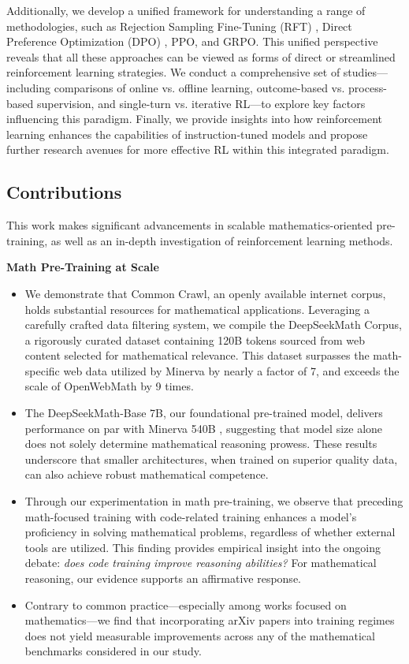 Additionally, we develop a unified framework for understanding a range of methodologies, such as Rejection Sampling Fine-Tuning (RFT) \citep{yuan2023scaling}, Direct Preference Optimization (DPO) \citep{dpo}, PPO, and GRPO. This unified perspective reveals that all these approaches can be viewed as forms of direct or streamlined reinforcement learning strategies. We conduct a comprehensive set of studies—including comparisons of online vs. offline learning, outcome-based vs. process-based supervision, and single-turn vs. iterative RL—to explore key factors influencing this paradigm. Finally, we provide insights into how reinforcement learning enhances the capabilities of instruction-tuned models and propose further research avenues for more effective RL within this integrated paradigm.

\subsection{Contributions}
This work makes significant advancements in scalable mathematics-oriented pre-training, as well as an in-depth investigation of reinforcement learning methods.

\textbf{Math Pre-Training at Scale}

\begin{itemize}[topsep=0pt]
    \item We demonstrate that Common Crawl, an openly available internet corpus, holds substantial resources for mathematical applications. Leveraging a carefully crafted data filtering system, we compile the DeepSeekMath Corpus, a rigorously curated dataset containing 120B tokens sourced from web content selected for mathematical relevance. This dataset surpasses the math-specific web data utilized by Minerva \citep{minerva} by nearly a factor of 7, and exceeds the scale of OpenWebMath \citep{openwebmath} by 9 times.

    \item The DeepSeekMath-Base 7B, our foundational pre-trained model, delivers performance on par with Minerva 540B \citep{minerva}, suggesting that model size alone does not solely determine mathematical reasoning prowess. These results underscore that smaller architectures, when trained on superior quality data, can also achieve robust mathematical competence.

    \item Through our experimentation in math pre-training, we observe that preceding math-focused training with code-related training enhances a model’s proficiency in solving mathematical problems, regardless of whether external tools are utilized. This finding provides empirical insight into the ongoing debate: \textit{does code training improve reasoning abilities?} For mathematical reasoning, our evidence supports an affirmative response.

    \item Contrary to common practice—especially among works focused on mathematics—we find that incorporating arXiv papers into training regimes does not yield measurable improvements across any of the mathematical benchmarks considered in our study.
\end{itemize}

